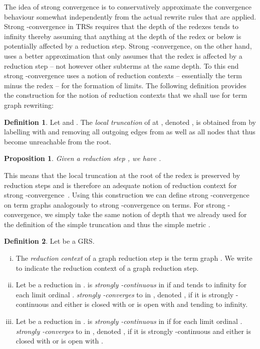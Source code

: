 \documentclass[copyright,creativecommons,UKenglish,final]{eptcs}
\theoremstyle{definition}
\newtheorem{definition}{Definition}[section]
\theoremstyle{plain}
\newtheorem{proposition}{Proposition}[section]
\begin{document}
The idea of strong convergence is to conservatively approximate the
convergence behaviour somewhat independently from the actual rewrite
rules that are applied. Strong -convergence in TRSs requires
that the depth of the redexes tends to infinity thereby assuming that
anything at the depth of the redex or below is potentially affected by
a reduction step. Strong -convergence, on the other hand, uses a
better approximation that only assumes that the redex is affected by a
reduction step -- not however other subterms at the same depth. To
this end strong -convergence uses a notion of reduction contexts
-- essentially the term minus the redex -- for the formation of
limits. The following definition provides the construction for the
notion of reduction contexts that we shall use for term graph
rewriting:
\begin{definition}\label{def:truncl}
  Let  and . The \emph{local truncation}
  of  at , denoted , is obtained from  by
  labelling  with  and removing all outgoing edges from 
  as well as all nodes that thus become unreachable from the
  root.
\end{definition}


\begin{proposition}
  \label{prop:stepContext}
  Given a reduction step , we have
  .
\end{proposition}
This means that the local truncation at the root of the redex is
preserved by reduction steps and is therefore an adequate notion of
reduction context for strong
-convergence~\cite{bahr10rta}. Using this construction we can
define strong -convergence on term graphs analogously to strong
-convergence on terms. For strong -convergence, we simply
take the same notion of depth that we already used for the definition
of the simple truncation  and thus the simple metric
.
\begin{definition}
  Let  be a GRS.
  \begin{enumerate}[(i)]
  \item The \emph{reduction context}  of a graph reduction step
     is the term graph
    . We write  to
    indicate the reduction context of a graph reduction step.
  \item Let  be
    a reduction in .  is \emph{strongly -continuous}
    in  if 
    and  tends to infinity
    for each limit ordinal .  \emph{strongly
      -converges} to  in , denoted , if it is strongly -continuous and either
     is closed with  or  is open with  and
     tending to infinity.
  \item Let  be
    a reduction in .  is \emph{strongly
      -continuous} in  if  for each limit ordinal .  \emph{strongly -converges} to  in ,
    denoted , if it is strongly
    -continuous and either  is closed with  or
     is open with .
  \end{enumerate}
\end{definition}
\end{document}
